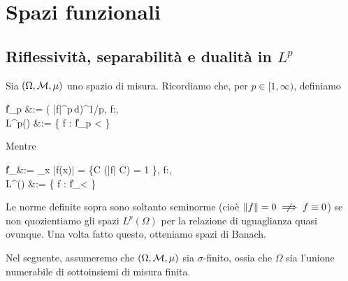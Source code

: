 \chapter{Spazi funzionali}
\section{Riflessività, separabilità e dualità in $L^p$}
Sia $(\Omega, \mathcal{M}, \mu)$ uno spazio di misura. Ricordiamo che, per $p \in [1,\infty)$, definiamo
\begin{eqalign*}
	\|f\|_p &:= \left( \int |f|^p\,d\mu \right)^{1/p}\!\!, \qquad f:\Omega \to \R,\\
	L^p(\Omega) &:= \{ f : \Omega \to \R \suchthat \|f\|_p < \infty \}
\end{eqalign*}
Mentre
\begin{eqalign*}
	\|f\|_\infty &:= \esssup_{x \in \Omega} |f(x)| = \inf \{C \in \R \suchthat \mu(|f| \leq C) = 1 \}, \qquad f:\Omega \to \R,\\
	L^\infty(\Omega) &:= \{ f : \Omega \to \R \suchthat \|f\|_\infty < \infty \}
\end{eqalign*}

Le norme definite sopra sono soltanto seminorme (cioè $\|f\| = 0 \nimplies f \equiv 0$) se non quozientiamo gli spazi $L^p(\Omega)$ per la relazione di uguaglianza quasi ovunque. Una volta fatto questo, otteniamo spazi di Banach.

Nel seguente, assumeremo che $(\Omega, \mathcal{M}, \mu)$ sia $\sigma$-finito, ossia che $\Omega$ sia l'unione numerabile di sottoinsiemi di misura finita.

